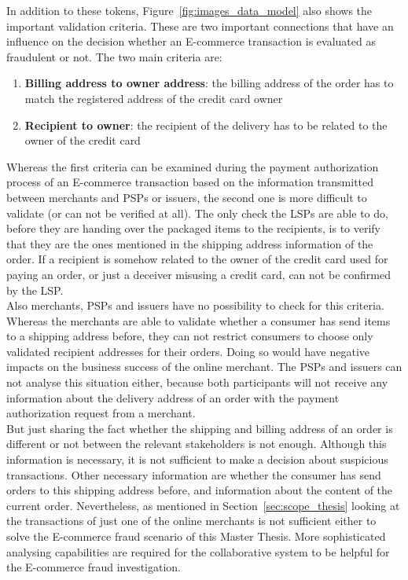 In addition to these tokens, Figure~\ref{fig:images_data_model} also shows the important validation criteria. These are two important connections that have an influence on the decision whether an \gls{E-commerce} transaction is evaluated as fraudulent or not. The two main criteria are: \@

\begin{enumerate}
  \item \textbf{Billing address to owner address}: the billing address of the order has to match the registered address of the credit card owner
  \item \textbf{Recipient to owner}: the recipient of the delivery has to be related to the owner of the credit card
\end{enumerate}

Whereas the first criteria can be examined during the payment authorization process of an \gls{E-commerce} transaction based on the information transmitted between merchants and \gls{PSP}s or issuers, the second one is more difficult to validate (or can not be verified at all). The only check the \gls{LSP}s are able to do, before they are handing over the packaged items to the recipients, is to verify that they are the ones mentioned in the shipping address information of the order. If a recipient is somehow related to the owner of the credit card used for paying an order, or just a deceiver misusing a credit card, can not be confirmed by the \gls{LSP}. \\

Also merchants, \gls{PSP}s and issuers have no possibility to check for this criteria. Whereas the merchants are able to validate whether a consumer has send items to a shipping address before, they can not restrict consumers to choose only validated recipient addresses for their orders. Doing so would have negative impacts on the business success of the online merchant. The \gls{PSP}s and issuers can not analyse this situation either, because both participants will not receive any information about the delivery address of an order with the payment authorization request from a merchant. \\

But just sharing the fact whether the shipping and billing address of an order is different or not between the relevant stakeholders is not enough. Although this information is necessary, it is not sufficient to make a decision about suspicious transactions. Other necessary information are whether the consumer has send orders to this shipping address before, and information about the content of the current order. Nevertheless, as mentioned in Section~\ref{sec:scope_thesis} looking at the transactions of just one of the online merchants is not sufficient either to solve the \gls{E-commerce} fraud scenario of this Master Thesis. More sophisticated analysing capabilities are required for the collaborative system to be helpful for the \gls{E-commerce} fraud investigation.

